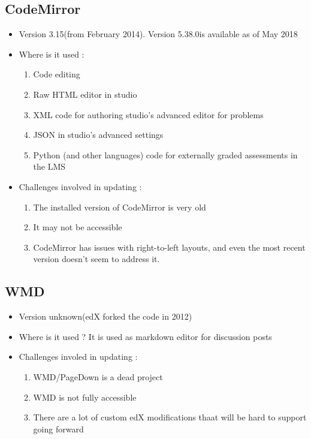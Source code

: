 \subsection{CodeMirror}
\begin{itemize}
	\item Version 3.15(from February 2014). Version 5.38.0is available as of May 2018
	\item Where is it used :
		\begin{enumerate}
			\item Code editing
			\item Raw HTML editor in studio
			\item XML code for authoring studio's advanced editor for problems
			\item JSON in studio's advanced settings
			\item Python (and other languages) code for externally graded assessments in the LMS
		\end{enumerate}
	\item Challenges involved in updating :
		\begin{enumerate}
			\item The installed version of CodeMirror is very old
			\item It may not be accessible
			\item CodeMirror has issues with right-to-left layouts, and even the most recent version doesn't seem to address it.
		\end{enumerate}
\end{itemize}

\subsection{WMD}
\begin{itemize}
	\item Version unknown(edX forked the code in 2012)
	\item Where is it used ? It is used as markdown editor for discussion posts
	\item Challenges involed in updating :
		\begin{enumerate}
			\item WMD/PageDown is a dead project
			\item WMD is not fully accessible
			\item There are a lot of custom edX modifications thaat will be hard to support going forward
		\end{enumerate}
\end{itemize}

